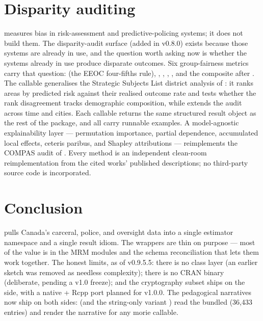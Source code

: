\documentclass[article,shortnames,nojss]{jss}
\begin{document}
\section{Disparity auditing}
\label{sec:fairness}

 measures bias in risk-assessment and
predictive-policing systems; it does not build them. The
disparity-audit surface (added in v0.8.0) exists because those
systems are already in use, and the question worth asking now
is whether the systems already in use produce disparate
outcomes. Six group-fairness metrics carry that question:
 (the EEOC four-fifths
rule), ,
,
,
, and the composite
 after
\citet{Barman2026PredictivePolicingBias}.  The
 callable generalises
the Strategic Subjects List district analysis of
\citet{Lacherade2021PredPolChicago}: it ranks areas by predicted
risk against their realised outcome rate and tests whether the
rank disagreement tracks demographic composition, while
 extends the audit
across time and cities.  Each callable returns the same structured
result object as the rest of the package, and all carry runnable
examples.  A model-agnostic explainability layer --- permutation
importance, partial dependence, accumulated local effects, ceteris
paribus, and Shapley attributions --- reimplements the COMPAS audit of
\citet{Biecek2021XAIStories}.  Every method is an independent
clean-room reimplementation from the cited works' published
descriptions; no third-party source code is incorporated.

\section{Conclusion}
\label{sec:conclusion}

 pulls Canada's carceral, police, and oversight
data into a single estimator namespace and a single result
idiom. The  wrappers are thin on purpose ---
most of the value is in the MRM modules and the schema
reconciliation that lets them work together. The honest
limits, as of v0.9.5.5: there is no  class layer (an
earlier sketch was removed as needless complexity); there is
no CRAN binary (deliberate, pending a v1.0 freeze); and the
cryptography subset ships on the  side, with
a native  + Rcpp port planned for v1.0.0. The
 pedagogical narratives now ship on both
sides:  (and the string-only variant
) read the bundled
 (36{,}433 entries) and render the
narrative for any morie callable.
\end{document}
